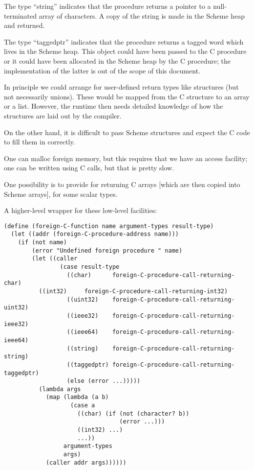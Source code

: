The type ``string'' indicates that the procedure returns a pointer
to a null-terminated array of characters. A copy of the string is made
in the Scheme heap and returned.

The type ``taggedptr'' indicates that the procedure returns a tagged word
which lives in the Scheme heap. This object could have been passed to the
C procedure or it could have been allocated in the Scheme heap by the C
procedure; the implementation of the latter is out of the scope of this
document.

In principle we could arrange for user-defined return types like structures
(but not necessarily unions). These would be mapped from the C structure to
an array or a list. However, the runtime then needs detailed knowledge of
how the structures are laid out by the compiler.

On the other hand, it is difficult to pass Scheme structures and expect the
C code to fill them in correctly.

One can malloc foreign memory, but this requires that we have an access
facility; one can be written using C calls, but that is pretty slow.

One possibility is to provide for returning C arrays [which are then copied
into Scheme arrays], for some scalar types.

A higher-level wrapper for these low-level facilities:

\begin{verbatim}
(define (foreign-C-function name argument-types result-type)
  (let ((addr (foreign-C-procedure-address name)))
    (if (not name)
        (error "Undefined foreign procedure " name)
        (let ((caller 
                (case result-type
                  ((char)      foreign-C-procedure-call-returning-char)
		  ((int32)     foreign-C-procedure-call-returning-int32)
                  ((uint32)    foreign-C-procedure-call-returning-uint32)
                  ((ieee32)    foreign-C-procedure-call-returning-ieee32)
                  ((ieee64)    foreign-C-procedure-call-returning-ieee64)
                  ((string)    foreign-C-procedure-call-returning-string)
                  ((taggedptr) foreign-C-procedure-call-returning-taggedptr)
                  (else (error ...)))))
          (lambda args
            (map (lambda (a b)
                   (case a
                     ((char) (if (not (character? b))
                                 (error ...)))
                     ((int32) ...)
                     ...))
                 argument-types
                 args)
            (caller addr args))))))
\end{verbatim}

	

